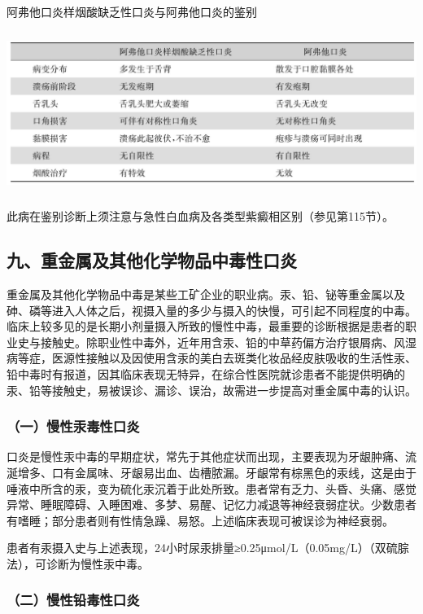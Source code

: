 \begin{table}[htbp]
\centering
\caption{阿弗他口炎样烟酸缺乏性口炎与阿弗他口炎的鉴别}
\label{tab18-4}
\includegraphics[width=5.91667in,height=2.07292in]{./images/Image00117.jpg}
\end{table}

此病在鉴别诊断上须注意与急性白血病及各类型紫癜相区别（参见第115节）。

\subsection{九、重金属及其他化学物品中毒性口炎}

重金属及其他化学物品中毒是某些工矿企业的职业病。汞、铅、铋等重金属以及砷、磷等进入人体之后，视摄入量的多少与摄入的快慢，可引起不同程度的中毒。临床上较多见的是长期小剂量摄入所致的慢性中毒，最重要的诊断根据是患者的职业史与接触史。除职业性中毒外，近年用含汞、铅的中草药偏方治疗银屑病、风湿病等症，医源性接触以及因使用含汞的美白去斑类化妆品经皮肤吸收的生活性汞、铅中毒时有报道，因其临床表现无特异，在综合性医院就诊患者不能提供明确的汞、铅等接触史，易被误诊、漏诊、误治，故需进一步提高对重金属中毒的认识。

\subsubsection{（一）慢性汞毒性口炎}

口炎是慢性汞中毒的早期症状，常先于其他症状而出现，主要表现为牙龈肿痛、流涎增多、口有金属味、牙龈易出血、齿槽脓漏。牙龈常有棕黑色的汞线，这是由于唾液中所含的汞，变为硫化汞沉着于此处所致。患者常有乏力、头昏、头痛、感觉异常、睡眠障碍、入睡困难、多梦、易醒、记忆力减退等神经衰弱症状。少数患者有嗜睡；部分患者则有性情急躁、易怒。上述临床表现可被误诊为神经衰弱。

患者有汞摄入史与上述表现，24小时尿汞排量≥0.25μmol/L（0.05mg/L）（双硫腙法），可诊断为慢性汞中毒。

\subsubsection{（二）慢性铅毒性口炎}

